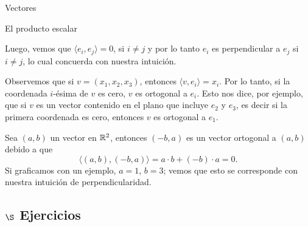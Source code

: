 \begin{chapter}{Vectores}
\begin{section}{El producto escalar}
\begin{ejemplo*}
            Luego, vemos que $\langle e_i , e_j \rangle = 0$, si $i \ne j$ y por lo tanto $e_i$  es perpendicular a $e_j$ si $i \ne j$, lo cual concuerda con nuestra intuición. 
        \end{ejemplo*} 
            
            Observemos que si $v = (x_1,x_2,x_3)$,  entonces $\langle v , e_i \rangle = x_i$. Por lo tanto,  si la coordenada $i$-ésima de $v$ es cero,  $v$  es ortogonal a $e_i$. Esto nos dice,  por ejemplo,  que si $v$  es un vector contenido en el plano que incluye $e_2$ y $e_3$,  es decir si la primera coordenada es cero,  entonces $v$  es ortogonal a $e_1$. 
            
        
        \begin{ejemplo*} Sea $(a,b)$ un vector en $\mathbb R^2$, entonces $(-b,a)$ es un vector ortogonal a $(a,b)$ debido a que
            \begin{equation*}
                \langle (a,b) , (-b,a) \rangle = a\cdot b + (-b) \cdot a = 0.
            \end{equation*}
            Si graficamos con un ejemplo, $a=1$, $b=3$; vemos que esto se corresponde con nuestra intuición de perpendicularidad. 
                
            \begin{center}
            \end{center}	
                
        \end{ejemplo*}
        

        \subsection*{$\S$ Ejercicios}
        \begin{enumex}
            

\end{enumex}
\end{section}
\end{chapter}
